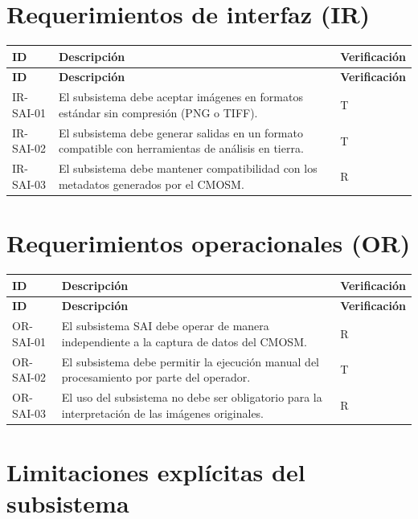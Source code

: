 \section{Requerimientos de interfaz (IR)}

\begin{longtable}{p{} p{} p{}}
\toprule
\textbf{ID} & \textbf{Descripción} & \textbf{Verificación} \\
\midrule
\endfirsthead
\toprule
\textbf{ID} & \textbf{Descripción} & \textbf{Verificación} \\
\midrule
\endhead
IR-SAI-01 & El subsistema debe aceptar imágenes en formatos estándar sin
compresión (PNG o TIFF). & T \\
IR-SAI-02 & El subsistema debe generar salidas en un formato compatible con
herramientas de análisis en tierra. & T \\
IR-SAI-03 & El subsistema debe mantener compatibilidad con los metadatos
generados por el CMOSM. & R \\
\bottomrule
\end{longtable}

\section{Requerimientos operacionales (OR)}

\begin{longtable}{p{} p{} p{}}
\toprule
\textbf{ID} & \textbf{Descripción} & \textbf{Verificación} \\
\midrule
\endfirsthead
\toprule
\textbf{ID} & \textbf{Descripción} & \textbf{Verificación} \\
\midrule
\endhead
OR-SAI-01 & El subsistema SAI debe operar de manera independiente a la captura de
datos del CMOSM. & R \\
OR-SAI-02 & El subsistema debe permitir la ejecución manual del procesamiento por
parte del operador. & T \\
OR-SAI-03 & El uso del subsistema no debe ser obligatorio para la interpretación
de las imágenes originales. & R \\
\bottomrule
\end{longtable}

\section{Limitaciones explícitas del subsistema}

